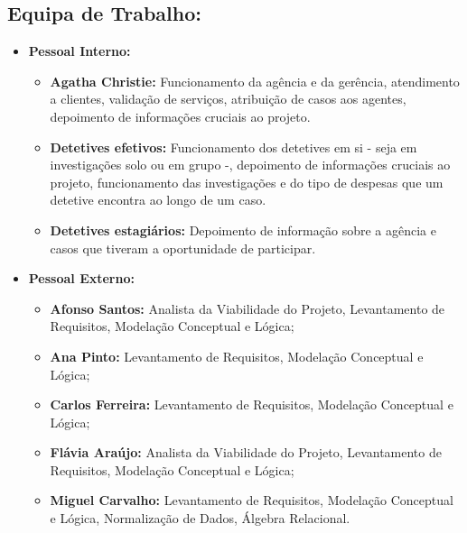 \documentclass[a4paper,12pt]{scrreprt}
\begin{document}
        \clearpage
        
        \subsection{Equipa de Trabalho:}
            \begin{itemize}
                \item \textbf{Pessoal Interno:}
                \begin{itemize}
                    \item \textbf{Agatha Christie:} Funcionamento da agência e da gerência, atendimento a clientes,
                    validação de serviços, atribuição de casos aos agentes, depoimento de informações
                    cruciais ao projeto.
                    \item\textbf{Detetives efetivos:} Funcionamento dos detetives em si - seja em investigações solo ou em grupo -, depoimento de informações cruciais ao projeto, funcionamento das investigações e do tipo de despesas que um detetive encontra ao longo de um caso. 
                    \item\textbf{Detetives estagiários:} Depoimento de informação sobre a agência e casos que tiveram a oportunidade de participar.
                \end{itemize}
            \item \textbf{Pessoal Externo:}
                \begin{itemize}
                    \item \textbf{Afonso Santos:} Analista da Viabilidade do Projeto, Levantamento de Requisitos, Modelação Conceptual e Lógica;
                    \item \textbf{Ana Pinto:} Levantamento de Requisitos, Modelação Conceptual e Lógica;
                    \item \textbf{Carlos Ferreira:} Levantamento de Requisitos, Modelação Conceptual e Lógica;
                    \item \textbf{Flávia Araújo:} Analista da Viabilidade do Projeto, Levantamento de Requisitos, Modelação Conceptual e Lógica;
                    \item \textbf{Miguel Carvalho:} Levantamento de Requisitos, Modelação Conceptual e Lógica, Normalização de Dados, Álgebra Relacional. 
                \end{itemize}
            \end{itemize}

    \clearpage
\end{document}
